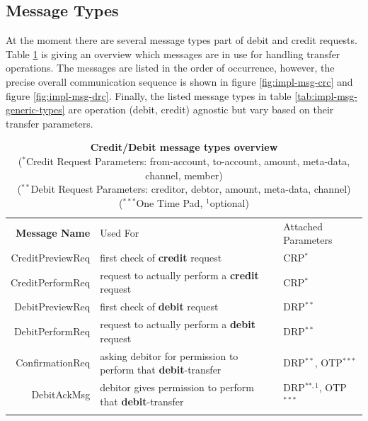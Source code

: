 \subsection{Message Types}
\label{subsec:impl-msg-types}

At the moment there are several message types part of debit and credit requests. Table \ref{tab:impl-transfer-types} is giving an overview which messages are in use for handling transfer operations. The messages are listed in the order of occurrence, however, the precise overall communication sequence is shown in figure \ref{fig:impl-msg-crc} and figure \ref{fig:impl-msg-drc}. Finally, the listed message types in table \ref{tab:impl-msg-generic-types} are operation (debit, credit) agnostic but vary based on their transfer parameters.

\begin{table}[H]
\begin{centering}
\small
{
\begin{tabular}{ r | p{7cm} | p{4cm} }
\hline
\textbf{Message Name} & Used For & Attached Parameters \\
\Xhline{1.5pt}

CreditPreviewReq & first check of \textbf{credit} request & CRP$^{*}$ \\[3pt]
\hline
CreditPerformReq & request to actually perform a \textbf{credit} request & CRP$^{*}$ \\[3pt]
\Xhline{1.5pt}
DebitPreviewReq & first check of \textbf{debit} request & DRP$^{**}$ \\[3pt]
\hline
DebitPerformReq & request to actually perform a \textbf{debit} request & DRP$^{**}$ \\[3pt]
\hline
ConfirmationReq & asking debitor for permission to perform that \textbf{debit}-transfer & DRP$^{**}$, OTP$^{***}$ \\[3pt]
\hline
DebitAckMsg & debitor gives permission to perform that \textbf{debit}-transfer & DRP$^{**, 1}$, OTP$^{***}$ \\[3pt]

\Xhline{1.5pt}
\end{tabular}
}
\caption{\small\textbf{Credit/Debit message types overview}\\
($^{*}$Credit Request Parameters: from-account, to-account, amount, meta-data, channel, member)\\
($^{**}$Debit Request Parameters:  creditor, debtor, amount, meta-data, channel)\\
($^{***}$One Time Pad, $^1$optional)}
\label{tab:impl-transfer-types}
\end{centering}
\vspace{-0.5cm}
\end{table}


